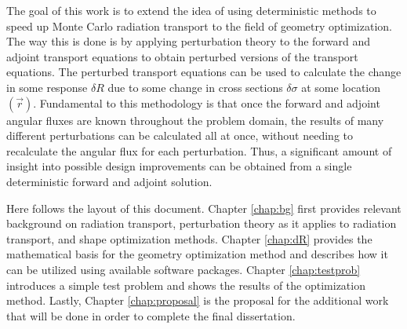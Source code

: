 The goal of this work is to extend the idea of using deterministic methods to speed up Monte Carlo radiation transport to the field of geometry optimization.
The way this is done is by applying perturbation theory to the forward and adjoint transport equations to obtain perturbed versions of the transport equations.
The perturbed transport equations can be used to calculate the change in some response $\delta R$ due to some change in cross sections $\delta\sigma$ at some location $\left(\vec{r}\right)$.
Fundamental to this methodology is that once the forward and adjoint angular fluxes are known throughout the problem domain, the results of many different perturbations can be calculated all at once, without needing to recalculate the angular flux for each perturbation.
Thus, a significant amount of insight into possible design improvements can be obtained from a single deterministic forward and adjoint solution.

Here follows the layout of this document.
Chapter \ref{chap:bg} first provides relevant background on radiation transport, perturbation theory as it applies to radiation transport, and shape optimization methods.
Chapter \ref{chap:dR} provides the mathematical basis for the geometry optimization method and describes how it can be utilized using available software packages.
Chapter \ref{chap:testprob} introduces a simple test problem and shows the results of the optimization method.
Lastly, Chapter \ref{chap:proposal} is the proposal for the additional work that will be done in order to complete the final dissertation.


